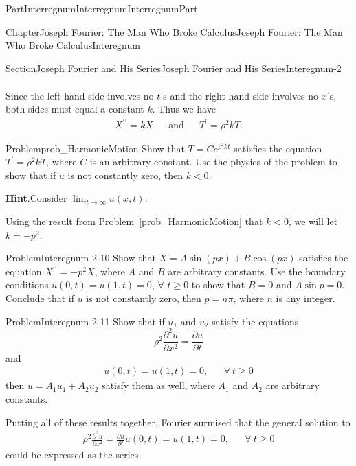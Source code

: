 \documentclass[oneside,10pt,]{book}
\newcommand{\blocktitlefont}{\relax}
\newcommand{\xreffont}{\relax}
\numberwithin{equation}{part}
\def\limit#1#2#3{{\displaystyle\lim_{#1\rightarrow #2}#3}}
\newcommand{\lt}{<}
\newcommand{\amp}{&}
\begin{document}
\begin{partptx}{Part}{Interregnum}{}{Interregnum}{}{}{InterregnumPart}
\begin{chapterptx}{Chapter}{Joseph Fourier: The Man Who Broke Calculus}{}{Joseph Fourier: The Man Who Broke Calculus}{}{}{Interegnum}
\begin{sectionptx}{Section}{Joseph Fourier and His Series}{}{Joseph Fourier and His Series}{}{}{Interegnum-2}
\begin{align*}
\end{align*}
%
\par
Since the left-hand side involves no \(t\)'s and the right-hand side involves no \(x\)'s, both sides must equal a constant \(k\). Thus we have%
\begin{align*}
X^{\prime\prime}=k X\amp{}\amp{}\text{and}\amp{}\amp{}
T^\prime=\rho^2k T.
\end{align*}
%
\begin{problem}{Problem}{}{prob_HarmonicMotion}%
Show that \(T=Ce^{\rho^2kt}\) satisfies the equation \(T^\prime=\rho^2k T\), where \(C\) is an arbitrary constant.  Use the physics of the problem to show that if \(u\) is not constantly zero, then \(k\lt 0\).%
\par\smallskip%
\noindent\textbf{\blocktitlefont Hint}.\hypertarget{prob_HarmonicMotion-4}{}\quad{}Consider \(\limit{t}{\infty}{u(x,t)}\).%
\end{problem}
Using the result from \hyperref[prob_HarmonicMotion]{Problem~{\xreffont\ref{prob_HarmonicMotion}}} that \(k\lt 0\), we will let \(k=-p^2\).%
\begin{problem}{Problem}{}{Interegnum-2-10}%
Show that \(X=A\sin\left(px\right)+B\cos\left(px\right)\) satisfies the equation \(X^{\prime\prime}=-p^2X\), where \(A\) and \(B\) are arbitrary constants.  Use the boundary conditions \(u(0,t)=u(1,t)=0\), \(\forall\) \(t\geq 0\) to show that \(B=0\) and \(A\sin p=0\).  Conclude that if \(u\) is not constantly zero, then \(p=n\pi\), where \(n\) is any integer.%
\end{problem}
\begin{problem}{Problem}{}{Interegnum-2-11}%
Show that if \(u_1\) and \(u_2\) satisfy the equations%
\begin{equation*}
\rho^2\frac{\partial^2u}{\partial x^2}=\frac{\partial
u}{\partial t}
\end{equation*}
and%
\begin{align*}
u(0,t)=u(1,t)=0,\amp{}\amp{} \forall\  t\geq   0
\end{align*}
then \(u=A_1u_1+A_2u_2\) satisfy them as well, where \(A_1\) and \(A_2\) are arbitrary constants.%
\end{problem}
 Putting all of these results together, Fourier surmised that the general solution to%
\begin{align*}
\rho^2\frac{\partial^2u}{\partial x^2}=\frac{\partial
u}{\partial t} u(0,t)=u(1,t)=0,\amp{}\amp{}\forall\ t\geq 0
\end{align*}
could be expressed as the series%

\end{sectionptx}
\end{chapterptx}
\end{partptx}
\end{document}
